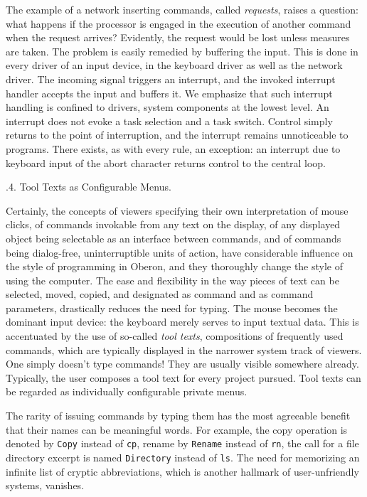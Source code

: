 The example of a network inserting commands, called {\it requests\/}, raises a
question: what happens if the processor is engaged in the execution of
another command when the request arrives? Evidently, the request would
be lost unless measures are taken. The problem is easily remedied by
buffering the input. This is done in every driver of an input device,
in the keyboard driver as well as the network driver. The incoming
signal triggers an interrupt, and the invoked interrupt handler
accepts the input and buffers it. We emphasize that such interrupt
handling is confined to drivers, system components at the lowest
level. An interrupt does not evoke a task selection and a task
switch. Control simply returns to the point of interruption, and the
interrupt remains unnoticeable to programs. There exists, as with
every rule, an exception: an interrupt due to keyboard input of the
abort character returns control to the central loop.

.4. Tool Texts as Configurable Menus.

Certainly, the concepts of viewers specifying their own interpretation
of mouse clicks, of commands invokable from any text on the display,
of any displayed object being selectable as an interface between
commands, and of commands being dialog-free, uninterruptible units of
action, have considerable influence on the style of programming in
Oberon, and they thoroughly change the style of using the
computer. The ease and flexibility in the way pieces of text can be
selected, moved, copied, and designated as command and as command
parameters, drastically reduces the need for typing. The mouse becomes
the dominant input device: the keyboard merely serves to input textual
data. This is accentuated by the use of so-called {\it tool texts\/},
compositions of frequently used commands, which are typically
displayed in the narrower system track of viewers. One simply doesn't
type commands! They are usually visible somewhere already. Typically,
the user composes a tool text for every project pursued. Tool texts
can be regarded as individually configurable private menus.

The rarity of issuing commands by typing them has the most agreeable
benefit that their names can be meaningful words. For example, the
copy operation is denoted by {\tt Copy} instead of {\tt cp}, rename by {\tt Rename}
instead of {\tt rn}, the call for a file directory excerpt is named
{\tt Directory} instead of {\tt ls}. The need for memorizing an infinite list of
cryptic abbreviations, which is another hallmark of user-unfriendly
systems, vanishes.

